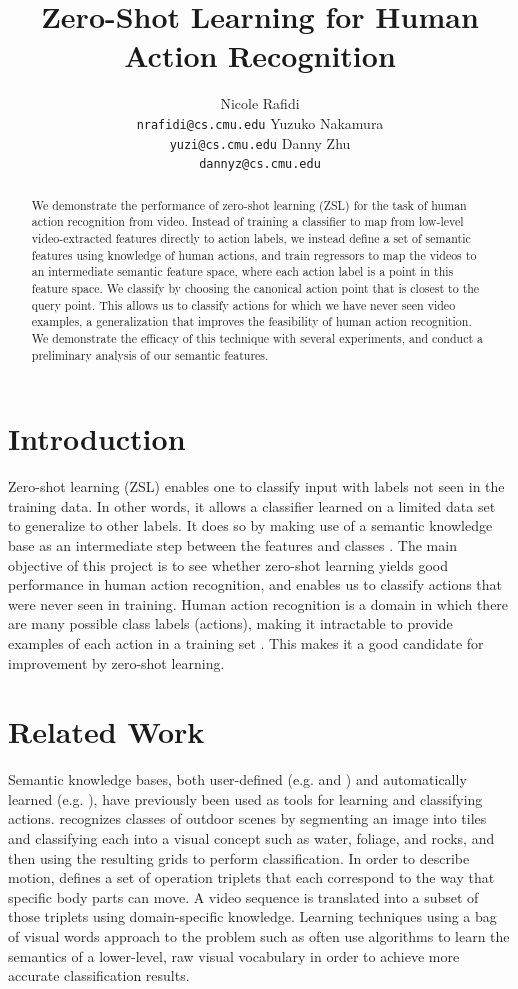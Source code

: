 \documentclass{article}
\title{Zero-Shot Learning for Human Action Recognition}
\author{Nicole Rafidi \\
  \texttt{nrafidi@cs.cmu.edu}
  \And
  Yuzuko Nakamura \\
  \texttt{yuzi@cs.cmu.edu}
  \And
  Danny Zhu \\
  \texttt{dannyz@cs.cmu.edu}
}
\begin{document}
\maketitle

\begin{abstract}
We demonstrate the performance of zero-shot learning (ZSL) for the task of human action recognition from video. Instead of training a classifier to map from low-level video-extracted features directly to action labels, we instead define a set of semantic features using knowledge of human actions, and train regressors to map the videos to an intermediate semantic feature space, where each action label is a point in this feature space. We classify by choosing the canonical action point that is closest to the query point. This allows us to classify actions for which we have never seen video examples, a generalization that improves the feasibility of human action recognition. We demonstrate the efficacy of this technique with several experiments, and conduct a preliminary analysis of our semantic features.
\end{abstract}

\section{Introduction}
Zero-shot learning (ZSL) enables one to classify input with labels not seen in the training data. In other words, it allows a classifier learned on a limited data set to generalize to other labels. It does so by making use of a semantic knowledge base as an intermediate step between the features and classes \cite{Palatucci09}. The main objective of this project is to see whether zero-shot learning yields good performance in human action recognition, and enables us to classify actions that were never seen in training. Human action recognition is a domain in which there are many possible class labels (actions), making it intractable to provide examples of each action in a training set \cite{Poppe10}. This makes it a good candidate for improvement by zero-shot learning.

\section{Related Work}
Semantic knowledge bases, both user-defined (e.g. \cite{Vogel07} and \cite{Park04}) and automatically learned (e.g. \cite{Zhao10}), have previously been used as tools for learning and classifying actions. \cite{Vogel07} recognizes classes of outdoor scenes by segmenting an image into tiles and classifying each into a visual concept such as water, foliage, and rocks, and then using the resulting grids to perform classification. In order to describe motion, \cite{Park04} defines a set of operation triplets that each correspond to the way that specific body parts can move. A video sequence is translated into a subset of those triplets using domain-specific knowledge. Learning techniques using a bag of visual words approach to the problem such as \cite{Zhao10} often use algorithms to learn the semantics of a lower-level, raw visual vocabulary in order to achieve more accurate classification results.
\end{document}
